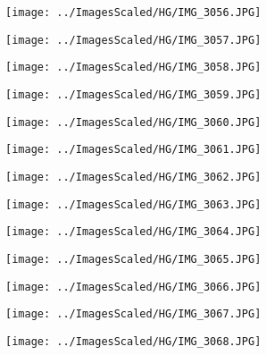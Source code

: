 \begin{figure}[H]
    \centering
    \texttt{[image: ../ImagesScaled/HG/IMG\_3056.JPG]}
\end{figure}
\begin{figure}[H]
    \centering
    \texttt{[image: ../ImagesScaled/HG/IMG\_3057.JPG]}
\end{figure}
\begin{figure}[H]
    \centering
    \texttt{[image: ../ImagesScaled/HG/IMG\_3058.JPG]}
\end{figure}
\begin{figure}[H]
    \centering
    \texttt{[image: ../ImagesScaled/HG/IMG\_3059.JPG]}
\end{figure}
\begin{figure}[H]
    \centering
    \texttt{[image: ../ImagesScaled/HG/IMG\_3060.JPG]}
\end{figure}
\begin{figure}[H]
    \centering
    \texttt{[image: ../ImagesScaled/HG/IMG\_3061.JPG]}
\end{figure}
\begin{figure}[H]
    \centering
    \texttt{[image: ../ImagesScaled/HG/IMG\_3062.JPG]}
\end{figure}
\begin{figure}[H]
    \centering
    \texttt{[image: ../ImagesScaled/HG/IMG\_3063.JPG]}
\end{figure}
\begin{figure}[H]
    \centering
    \texttt{[image: ../ImagesScaled/HG/IMG\_3064.JPG]}
\end{figure}
\begin{figure}[H]
    \centering
    \texttt{[image: ../ImagesScaled/HG/IMG\_3065.JPG]}
\end{figure}
\begin{figure}[H]
    \centering
    \texttt{[image: ../ImagesScaled/HG/IMG\_3066.JPG]}
\end{figure}
\begin{figure}[H]
    \centering
    \texttt{[image: ../ImagesScaled/HG/IMG\_3067.JPG]}
\end{figure}
\begin{figure}[H]
    \centering
    \texttt{[image: ../ImagesScaled/HG/IMG\_3068.JPG]}
\end{figure}
